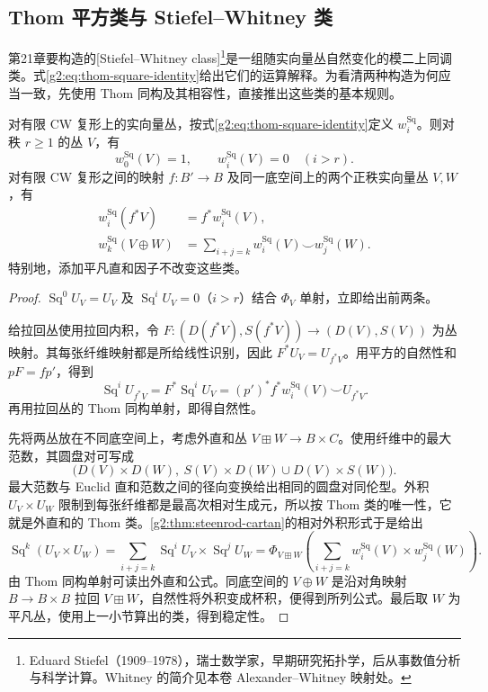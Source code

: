 \subsection{Thom 平方类与 Stiefel–Whitney 类}
\label{g2:subsec:1304:02}

第21章要构造的[Stiefel--Whitney class]\footnote{Eduard Stiefel（1909--1978），瑞士数学家，早期研究拓扑学，后从事数值分析与科学计算。Whitney 的简介见本卷 Alexander--Whitney 映射处。}是一组随实向量丛自然变化的模二上同调类。式\eqref{g2:eq:thom-square-identity}给出它们的运算解释。为看清两种构造为何应当一致，先使用 Thom 同构及其相容性，直接推出这些类的基本规则。

\begin{proposition}\label{g2:prop:thom-square-properties}
	对有限 CW 复形上的实向量丛，按式\eqref{g2:eq:thom-square-identity}定义 \(w_i^{\mathrm{Sq}}\)。则对秩 \(r\ge1\) 的丛 \(V\)，有
	\[
		w_0^{\mathrm{Sq}}(V)=1,\qquad w_i^{\mathrm{Sq}}(V)=0\quad(i>r).
	\]
	对有限 CW 复形之间的映射 \(f:B'\to B\) 及同一底空间上的两个正秩实向量丛 \(V,W\)，有
	\begin{align*}
		w_i^{\mathrm{Sq}}(f^*V)&=f^*w_i^{\mathrm{Sq}}(V),\\
		w_k^{\mathrm{Sq}}(V\oplus W)&=\sum_{i+j=k}w_i^{\mathrm{Sq}}(V)\smile w_j^{\mathrm{Sq}}(W).
	\end{align*}
	特别地，添加平凡直和因子不改变这些类。
\end{proposition}
\begin{proof}
	\(\operatorname{Sq}^0U_V=U_V\) 及 \(\operatorname{Sq}^iU_V=0\)（\(i>r\)）结合 \(\Phi_V\) 单射，立即给出前两条。

	给拉回丛使用拉回内积，令 \(F:(D(f^*V),S(f^*V))\to(D(V),S(V))\) 为丛映射。其每张纤维映射都是所给线性识别，因此 \(F^*U_V=U_{f^*V}\)。用平方的自然性和 \(pF=fp'\)，得到
	\[
		\operatorname{Sq}^iU_{f^*V}=F^*\operatorname{Sq}^iU_V
		=(p')^*f^*w_i^{\mathrm{Sq}}(V)\smile U_{f^*V}.
	\]
	再用拉回丛的 Thom 同构单射，即得自然性。

	先将两丛放在不同底空间上，考虑外直和丛 \(V\boxplus W\to B\times C\)。使用纤维中的最大范数，其圆盘对可写成
	\[
		\bigl(D(V)\times D(W),\ S(V)\times D(W)\cup D(V)\times S(W)\bigr).
	\]
	最大范数与 Euclid 直和范数之间的径向变换给出相同的圆盘对同伦型。外积 \(U_V\times U_W\) 限制到每张纤维都是最高次相对生成元，所以按 Thom 类的唯一性，它就是外直和的 Thom 类。\cref{g2:thm:steenrod-cartan}的相对外积形式于是给出
	\[
		\operatorname{Sq}^k(U_V\times U_W)
		=\sum_{i+j=k}\operatorname{Sq}^iU_V\times\operatorname{Sq}^jU_W
		=\Phi_{V\boxplus W}\!\left(\sum_{i+j=k}w_i^{\mathrm{Sq}}(V)\times w_j^{\mathrm{Sq}}(W)\right).
	\]
	由 Thom 同构单射可读出外直和公式。同底空间的 \(V\oplus W\) 是沿对角映射 \(B\to B\times B\) 拉回 \(V\boxplus W\)，自然性将外积变成杯积，便得到所列公式。最后取 \(W\) 为平凡丛，使用上一小节算出的类，得到稳定性。
\end{proof}

